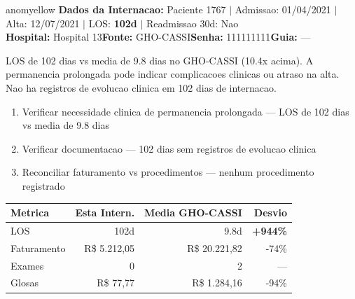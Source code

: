 \documentclass[a4paper,10pt]{article}
\begin{document}
\newpage

\begin{anomalycard}[Internacao 1548 | GHO-CASSI | MODERADO (z=2.13)]{anomyellow}
\textbf{Dados da Internacao:} Paciente 1767 $\mid$ Admissao: 01/04/2021 $\mid$ Alta: 12/07/2021 $\mid$ LOS: \textbf{102d} $\mid$ Readmissao 30d: Nao\\
\textbf{Hospital:} Hospital 13\quad\textbf{Fonte:} GHO-CASSI\quad\textbf{Senha:} 111111111\quad\textbf{Guia:} ---\\
\vspace{2pt}\begin{tcolorbox}[colback=severityred!20,colframe=anomyellow,title={\textbf{Interpretacao de Negocio}},fonttitle=\bfseries\small,left=4pt,right=4pt,top=3pt,bottom=3pt]
{\small LOS de 102 dias vs media de 9.8 dias no GHO-CASSI (10.4x acima). A permanencia prolongada pode indicar complicacoes clinicas ou atraso na alta. Nao ha registros de evolucao clinica em 102 dias de internacao.}
\end{tcolorbox}
\begin{tcolorbox}[colback=severityyellow!30,colframe=anomorange,title={\textbf{Recomendacoes Especificas}},fonttitle=\bfseries\small,left=4pt,right=4pt,top=3pt,bottom=3pt]
\begin{enumerate}[nosep,leftmargin=16pt]
\item {\small Verificar necessidade clinica de permanencia prolongada --- LOS de 102 dias vs media de 9.8 dias}
\item {\small Verificar documentacao --- 102 dias sem registros de evolucao clinica}
\item {\small Reconciliar faturamento vs procedimentos --- nenhum procedimento registrado}
\end{enumerate}
\end{tcolorbox}
\begin{center}\begin{tabular}{l r r r}\toprule\textbf{Metrica} & \textbf{Esta Intern.} & \textbf{Media GHO-CASSI} & \textbf{Desvio} \\\midrule
LOS & 102d & 9.8d & \textcolor{anomred}{\textbf{+944\%}} \\
Faturamento & R\$ 5.212,05 & R\$ 20.221,82 & -74\% \\
Exames & 0 & 2 & --- \\
Glosas & R\$ 77,77 & R\$ 1.284,16 & -94\% \\
\bottomrule\end{tabular}\end{center}


\end{anomalycard}
\end{document}

